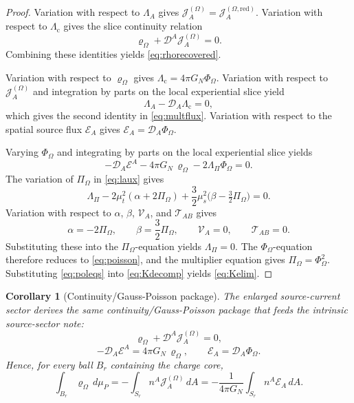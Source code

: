 \documentclass[11pt]{article}
\newcommand{\SpatialD}{\mathcal D}
\newcommand{\FlowPot}{\Phi_\Omega}
\newcommand{\BalanceField}{\Pi_\Omega}
\newcommand{\BalMult}{\Lambda_\Pi}
\newcommand{\SourceDensity}{\varrho_\Omega}
\newcommand{\SourceCurrent}{\mathcal J^{(\Omega)}}
\newcommand{\SourceCurrentRed}{\mathcal J^{(\Omega,\mathrm{red})}}
\newcommand{\ContMult}{\Lambda_{\mathrm c}}
\newcommand{\CurrentMult}{\Lambda}
\newcommand{\SourceFlux}{\mathcal E}
\newtheorem{corollary}{Corollary}
\begin{document}
\begin{proof}
Variation with respect to \(\CurrentMult_A\) gives \(\SourceCurrent_A=\SourceCurrentRed_A\). Variation with respect to \(\ContMult\) gives the slice continuity relation
\[
\SourceDensity+\SpatialD^A\SourceCurrent_A=0.
\]
Combining these identities yields \eqref{eq:rhorecovered}.

Variation with respect to \(\SourceDensity\) gives \(\ContMult=4\pi G_N\FlowPot\). Variation with respect to \(\SourceCurrent_A\) and integration by parts on the local experiential slice yield
\[
\CurrentMult_A-\SpatialD_A\ContMult=0,
\]
which gives the second identity in \eqref{eq:multflux}. Variation with respect to the spatial source flux \(\SourceFlux_A\) gives \(\SourceFlux_A=\SpatialD_A\FlowPot\).

Varying \(\FlowPot\) and integrating by parts on the local experiential slice yields
\[
-\SpatialD_A\SourceFlux^A-4\pi G_N\,\SourceDensity-2\BalMult\FlowPot=0.
\]
The variation of \(\BalanceField\) in \eqref{eq:laux} gives
\[
\BalMult
-2\mu_t^2(\alpha+2\BalanceField)
+\frac32\mu_s^2\bigl(\beta-\tfrac32\BalanceField\bigr)=0.
\]
Variation with respect to \(\alpha\), \(\beta\), \(\mathcal V_A\), and \(\mathcal T_{AB}\) gives
\[
\alpha=-2\BalanceField,
\qquad
\beta=\frac32\BalanceField,
\qquad
\mathcal V_A=0,
\qquad
\mathcal T_{AB}=0.
\]
Substituting these into the \(\BalanceField\)-equation yields \(\BalMult=0\). The \(\FlowPot\)-equation therefore reduces to \eqref{eq:poisson}, and the multiplier equation gives \(\BalanceField=\FlowPot^2\). Substituting \eqref{eq:poleqs} into \eqref{eq:Kdecomp} yields \eqref{eq:Kelim}.
\end{proof}

\begin{corollary}[Continuity/Gauss-Poisson package]
\label{cor:continuity}
The enlarged source-current sector derives the same continuity/Gauss-Poisson package that feeds the intrinsic source-sector note:
\begin{equation}
\SourceDensity+\SpatialD^A\SourceCurrent_A=0,
\label{eq:continuity}
\end{equation}
\begin{equation}
-\SpatialD_A\SourceFlux^A=4\pi G_N\,\SourceDensity,
\qquad
\SourceFlux_A=\SpatialD_A\FlowPot.
\label{eq:gausspoisson}
\end{equation}
Hence, for every ball \(B_r\) containing the charge core,
\begin{equation}
\int_{B_r}\SourceDensity\,d\mu_P
=
-\int_{S_r} n^A\SourceCurrent_A\,dA
=
-\frac{1}{4\pi G_N}\int_{S_r} n^A\SourceFlux_A\,dA.
\label{eq:doublegauss}
\end{equation}
\end{corollary}
\end{document}

